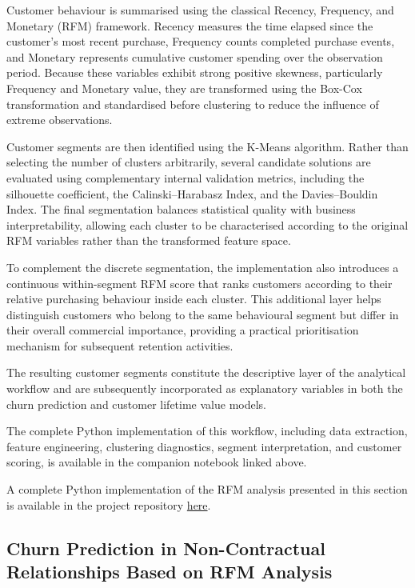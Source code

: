 \documentclass[
  12pt,
  letterpaper,
]{book}
\begin{document}
Customer behaviour is summarised using the classical Recency, Frequency,
and Monetary (RFM) framework. Recency measures the time elapsed since
the customer's most recent purchase, Frequency counts completed purchase
events, and Monetary represents cumulative customer spending over the
observation period. Because these variables exhibit strong positive
skewness, particularly Frequency and Monetary value, they are
transformed using the Box-Cox transformation and standardised before
clustering to reduce the influence of extreme observations.

Customer segments are then identified using the K-Means algorithm.
Rather than selecting the number of clusters arbitrarily, several
candidate solutions are evaluated using complementary internal
validation metrics, including the silhouette coefficient, the
Calinski--Harabasz Index, and the Davies--Bouldin Index. The final
segmentation balances statistical quality with business
interpretability, allowing each cluster to be characterised according to
the original RFM variables rather than the transformed feature space.

To complement the discrete segmentation, the implementation also
introduces a continuous within-segment RFM score that ranks customers
according to their relative purchasing behaviour inside each cluster.
This additional layer helps distinguish customers who belong to the same
behavioural segment but differ in their overall commercial importance,
providing a practical prioritisation mechanism for subsequent retention
activities.

The resulting customer segments constitute the descriptive layer of the
analytical workflow and are subsequently incorporated as explanatory
variables in both the churn prediction and customer lifetime value
models.

The complete Python implementation of this workflow, including data
extraction, feature engineering, clustering diagnostics, segment
interpretation, and customer scoring, is available in the companion
notebook linked above.

A complete Python implementation of the RFM analysis presented in this
section is available in the project repository
\href{https://github.com/rodrigokang/portfolio/tree/main/notebooks-and-scripts/2-retail-analytics/2-customer-value-and-retention}{here}.

\subsection{Churn Prediction in Non-Contractual Relationships Based on
RFM
Analysis}\label{churn-prediction-in-non-contractual-relationships-based-on-rfm-analysis}
\end{document}
